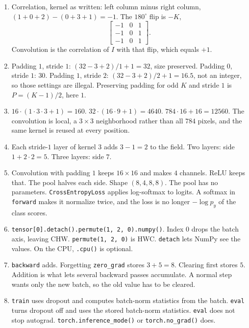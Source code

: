 \documentclass[11pt]{article}
\begin{document}
\begin{enumerate}
\item Correlation, kernel as written: left column minus right column, $(1+0+2)-(0+3+1)=-1$. The $180^\circ$ flip is $-K$,
\[
\begin{bmatrix}-1&0&1\\ -1&0&1\\ -1&0&1\end{bmatrix}.
\]
Convolution is the correlation of $I$ with that flip, which equals $+1$.

\item Padding $1$, stride $1$: $(32-3+2)/1+1=32$, size preserved. Padding $0$, stride $1$: $30$. Padding $1$, stride $2$: $(32-3+2)/2+1=16.5$, not an integer, so those settings are illegal. Preserving padding for odd $K$ and stride $1$ is $P=(K-1)/2$, here $1$.

\item $16\cdot(1\cdot 3\cdot 3+1)=160$. $32\cdot(16\cdot 9+1)=4640$. $784\cdot 16+16=12560$. The convolution is local, a $3\times 3$ neighborhood rather than all $784$ pixels, and the same kernel is reused at every position.

\item Each stride-$1$ layer of kernel $3$ adds $3-1=2$ to the field. Two layers: side $1+2\cdot 2=5$. Three layers: side $7$.

\item Convolution with padding $1$ keeps $16\times 16$ and makes $4$ channels. ReLU keeps that. The pool halves each side. Shape $(8,4,8,8)$. The pool has no parameters. \texttt{CrossEntropyLoss} applies log-softmax to logits. A softmax in \texttt{forward} makes it normalize twice, and the loss is no longer $-\log p_y$ of the class scores.

\item \texttt{tensor[0].detach().permute(1, 2, 0).numpy()}. Index $0$ drops the batch axis, leaving CHW. \texttt{permute(1, 2, 0)} is HWC. \texttt{detach} lets NumPy see the values. On the CPU, \texttt{.cpu()} is optional.

\item \texttt{backward} adds. Forgetting \texttt{zero\_grad} stores $3+5=8$. Clearing first stores $5$. Addition is what lets several backward passes accumulate. A normal step wants only the new batch, so the old value has to be cleared.

\item \texttt{train} uses dropout and computes batch-norm statistics from the batch. \texttt{eval} turns dropout off and uses the stored batch-norm statistics. \texttt{eval} does not stop autograd. \texttt{torch.inference\_mode()} or \texttt{torch.no\_grad()} does.


\end{enumerate}
\end{document}
